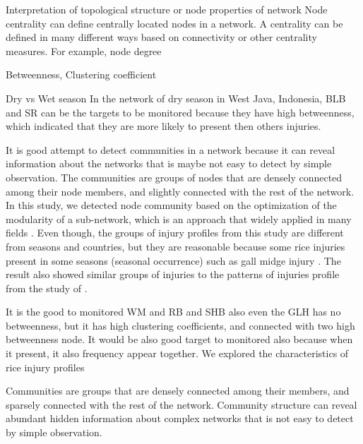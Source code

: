  Interpretation of topological structure or node properties of network
Node centrality can define centrally located nodes in a network. A centrality can be defined in many different ways based on connectivity or other centrality measures. For example, node degree

Betweenness,
Clustering coefficient


Dry vs Wet season
In the network of dry season in West Java, Indonesia, BLB and SR can be the targets to be monitored because they have high betweenness, which indicated that they are more likely to present then others injuries.

It is good attempt to detect communities in a network because it can reveal information about the networks that is maybe not easy to detect by simple observation. The communities are groups of nodes that are densely connected among their node members, and slightly connected with the rest of the network.  In this study, we detected node community based on the optimization of the modularity of a sub-network, which is an approach that widely applied in many fields \cite{Liu_2014_Detecting}. Even though, the groups of injury profiles from this study are different from seasons and countries, but they are reasonable because some rice injuries present in some seasons (seasonal occurrence) such as gall midge injury \cite{Krishnaiah_2004_Rice}. The result also showed similar groups of injuries to the patterns of injuries profile from the study of \cite{Savary_2000_Characterization}. 


It is the good to monitored WM and RB  and SHB also even the GLH has no betweenness, but it has high clustering coefficients, and connected with two high betweenness node. It would be also good target to monitored also because when it present, it also frequency appear together.
We explored the characteristics of rice injury profiles

Communities are groups that are densely connected among their members, and sparsely connected with the rest of the network. Community structure can reveal abundant hidden information about complex networks that is not easy to detect by simple observation. 


